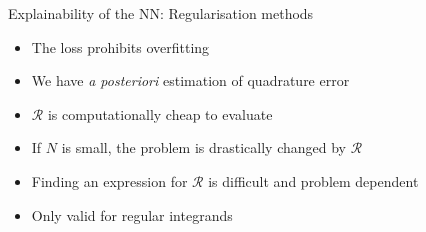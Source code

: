 %
%
%
%
%
%
%
%
\begin{frame}{Explainability of the NN: Regularisation methods}
\vspace{0.25cm}
\begin{itemize}
\item[\tickYes]The loss prohibits overfitting
\vspace{0.15cm}

\item[\tickYes] We have {\it a posteriori} estimation of quadrature error
\vspace{0.15cm}

\item[\tickYes] $\mathcal{R}$ is computationally cheap to evaluate
\vspace{0.15cm}
%
\item[\tickNo] If $N$ is small, the problem is drastically changed by $\mathcal{R}$
\vspace{0.15cm}

\item[\tickNo] Finding an expression for $\mathcal{R}$ is difficult and problem dependent
\vspace{0.15cm}

\item[\tickNo] Only valid for regular integrands
\end{itemize}

\end{frame}
